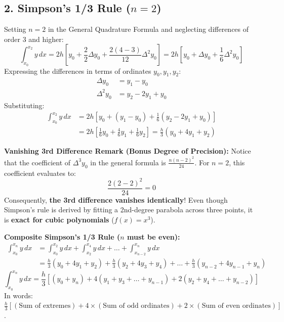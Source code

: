\subsection{2. Simpson's 1/3 Rule \texorpdfstring{($n = 2$)}{(n = 2)}}
\begin{theorembox}
Setting $n = 2$ in the General Quadrature Formula and neglecting differences of order 3 and higher:
\begin{equation}
    \int_{x_0}^{x_2} y \, dx = 2 h \left[ y_0 + \frac{2}{2} \Delta y_0 + \frac{2(4 - 3)}{12} \Delta^2 y_0 \right] = 2 h \left[ y_0 + \Delta y_0 + \frac{1}{6} \Delta^2 y_0 \right]
\end{equation}
Expressing the differences in terms of ordinates $y_0, y_1, y_2$:
\begin{align}
    \Delta y_0 &= y_1 - y_0 \nonumber \\
    \Delta^2 y_0 &= y_2 - 2 y_1 + y_0
\end{align}
Substituting:
\begin{align}
    \int_{x_0}^{x_2} y \, dx &= 2 h \left[ y_0 + (y_1 - y_0) + \frac{1}{6}(y_2 - 2 y_1 + y_0) \right] \nonumber \\
    &= 2 h \left[ \frac{1}{6} y_0 + \frac{4}{6} y_1 + \frac{1}{6} y_2 \right] = \boxed{\frac{h}{3}(y_0 + 4 y_1 + y_2)}
\end{align}

\textbf{Vanishing 3rd Difference Remark (Bonus Degree of Precision):}
Notice that the coefficient of $\Delta^3 y_0$ in the general formula is $\frac{n(n-2)^2}{24}$. For $n = 2$, this coefficient evaluates to:
\begin{equation}
    \frac{2(2 - 2)^2}{24} = 0
\end{equation}
Consequently, \textbf{the 3rd difference vanishes identically}! Even though Simpson's rule is derived by fitting a 2nd-degree parabola across three points, it is \textbf{exact for cubic polynomials} ($f(x) = x^3$).

\textbf{Composite Simpson's 1/3 Rule ($n$ must be even):}
\begin{align}
    \int_{x_0}^{x_n} y \, dx &= \int_{x_0}^{x_2} y \, dx + \int_{x_2}^{x_4} y \, dx + \dots + \int_{x_{n-2}}^{x_n} y \, dx \nonumber \\
    &= \frac{h}{3}(y_0 + 4y_1 + y_2) + \frac{h}{3}(y_2 + 4y_3 + y_4) + \dots + \frac{h}{3}(y_{n-2} + 4y_{n-1} + y_n)
\end{align}
\begin{equation}
    \boxed{
    \int_{x_0}^{x_n} y \, dx = \frac{h}{3} \left[ (y_0 + y_n) + 4(y_1 + y_3 + \dots + y_{n-1}) + 2(y_2 + y_4 + \dots + y_{n-2}) \right]
    }
\end{equation}
In words: $\frac{h}{3} \left[ (\text{Sum of extremes}) + 4 \times (\text{Sum of odd ordinates}) + 2 \times (\text{Sum of even ordinates}) \right]$.


\end{theorembox}
